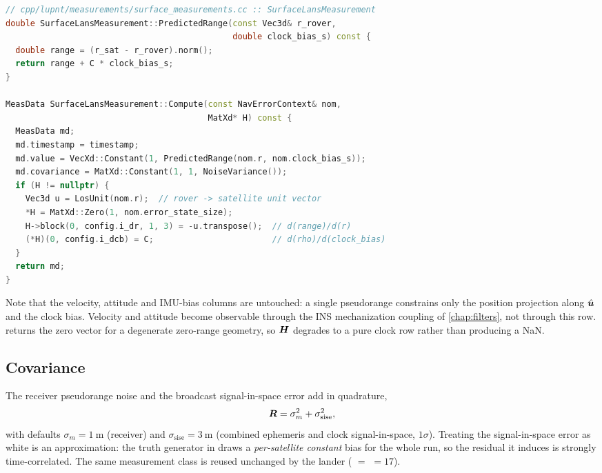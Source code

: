 \begin{lstlisting}[language=cpp, caption={LANS pseudorange prediction and
  error-state Jacobian.}, label={lst:meas-lans}]
// cpp/lupnt/measurements/surface_measurements.cc :: SurfaceLansMeasurement
double SurfaceLansMeasurement::PredictedRange(const Vec3d& r_rover,
                                              double clock_bias_s) const {
  double range = (r_sat - r_rover).norm();
  return range + C * clock_bias_s;
}

MeasData SurfaceLansMeasurement::Compute(const NavErrorContext& nom,
                                         MatXd* H) const {
  MeasData md;
  md.timestamp = timestamp;
  md.value = VecXd::Constant(1, PredictedRange(nom.r, nom.clock_bias_s));
  md.covariance = MatXd::Constant(1, 1, NoiseVariance());
  if (H != nullptr) {
    Vec3d u = LosUnit(nom.r);  // rover -> satellite unit vector
    *H = MatXd::Zero(1, nom.error_state_size);
    H->block(0, config.i_dr, 1, 3) = -u.transpose();  // d(range)/d(r)
    (*H)(0, config.i_dcb) = C;                        // d(rho)/d(clock_bias)
  }
  return md;
}
\end{lstlisting}

Note that the velocity, attitude and IMU-bias columns are untouched: a single
pseudorange constrains only the position projection along $\hat{\bm{u}}$ and the
clock bias. Velocity and attitude become observable through the INS
mechanization coupling of \cref{chap:filters}, not through this row.
 returns the zero vector for a degenerate zero-range geometry, so
$\bm{H}$ degrades to a pure clock row rather than producing a NaN.

\subsection{Covariance}

The receiver pseudorange noise and the broadcast signal-in-space error add in
quadrature,
\begin{equation}
  \bm{R} = \sigma_m^2 + \sigma_\mathrm{sise}^2 ,
  \label{eq:meas-lans-R}
\end{equation}
with defaults $\sigma_m = \SI{1}{\meter}$ (receiver) and
$\sigma_\mathrm{sise} = \SI{3}{\meter}$ (combined ephemeris and clock
signal-in-space, $1\sigma$). Treating the signal-in-space error as white is an
approximation: the truth generator in  draws a
\emph{per-satellite constant} bias  for the whole run,
so the residual it induces is strongly time-correlated. The same measurement
class is reused unchanged by the lander
( $=$  $= 17$).

